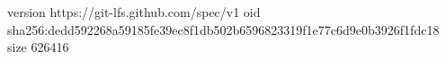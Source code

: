 version https://git-lfs.github.com/spec/v1
oid sha256:dedd592268a59185fe39ec8f1db502b6596823319f1e77c6d9e0b3926f1fdc18
size 626416
